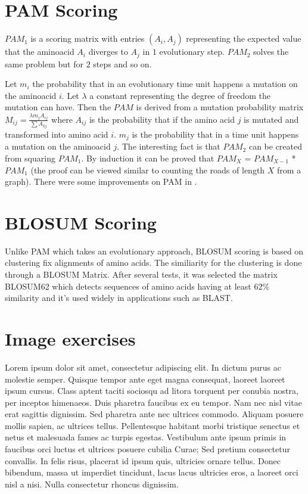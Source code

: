 \documentclass{llncs}
\begin{document}
\section{PAM Scoring}
$PAM_1$ is a scoring matrix with entries $(A_i, A_j)$ representing the expected value that the aminoacid $A_i$ diverges to $A_j$ in $1$ evolutionary step.
$PAM_2$ solves the same problem but for $2$ steps and so on.

Let $m_i$ the probability that in an evolutionary time unit happens a mutation on the aminoacid $i$.
Let $\lambda$ a constant representing the degree of freedom the mutation can have. Then the $PAM$ is derived from a mutation probability matrix $M_{ij} = \frac{\lambda m_j A_{ij}}{\sum{A_{kj}}}$ where $A_{ij}$ is the probability that if the amino acid $j$ is mutated and transformed into amino acid $i$. $m_j$ is the probability that in a time unit happens a mutation on the aminoacid $j$.
The interesting fact is that $PAM_2$ can be created from squaring $PAM_1$. By induction it can be proved that $PAM_X$ = $PAM_{X-1}$ * $PAM_1$ (the proof can be viewed similar to counting the roads of length $X$ from a graph). There were some improvements on PAM in \cite{jones:1992, whelan:2001}.


\section{BLOSUM Scoring}

Unlike PAM which takes an evolutionary approach, BLOSUM scoring is based on clustering fix alignments of amino acids. The similiarity for the clustering is done through a BLOSUM Matrix. After several tests, it was selected the matrix BLOSUM62 which detects sequences of amino acids having at least $62 \%$ similarity and it's used widely in applications such as BLAST.


\section{Image exercises}



Lorem ipsum dolor sit amet, consectetur adipiscing elit. In dictum purus ac molestie semper. Quisque tempor ante eget magna consequat, laoreet laoreet ipsum cursus. Class aptent taciti sociosqu ad litora torquent per conubia nostra, per inceptos himenaeos. Duis pharetra faucibus ex eu tempor. Nam nec nisl vitae erat sagittis dignissim. Sed pharetra ante nec ultrices commodo. Aliquam posuere mollis sapien, ac ultrices tellus. Pellentesque habitant morbi tristique senectus et netus et malesuada fames ac turpis egestas. Vestibulum ante ipsum primis in faucibus orci luctus et ultrices posuere cubilia Curae; Sed pretium consectetur convallis. In felis risus, placerat id ipsum quis, ultricies ornare tellus. Donec bibendum, massa ut imperdiet tincidunt, lacus lacus ultricies eros, a laoreet orci nisl a nisi. Nulla consectetur rhoncus dignissim.
\end{document}
